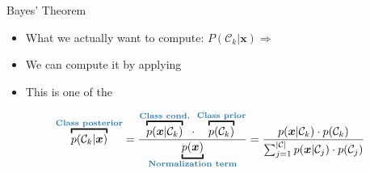\begin{frame}{Bayes' Theorem}{}\important
	\begin{itemize}
		\item What we actually want to compute: $P(\mathcal{C}_k \vert \bm{x}) \Rightarrow$
		\item We can compute it by applying 
		\item This is one of the 
	\end{itemize}

	\begin{boxBlue}
		\begin{equation}
			\overbracket{p(\mathcal{C}_k \vert \bm{x})}^{\text{\highlight{Class posterior}}}
				= \frac{
					\overbracket{p(\bm{x} \vert \mathcal{C}_k)}^{\text{\highlight{Class cond.}}}
					\cdot
					\overbracket{p(\mathcal{C}_k)}^{\text{\highlight{Class prior}}}
				}{
					\underbracket{p(\bm{x})}_{\text{\highlight{Normalization term}}}
				}
				= \frac{
					p(\bm{x} \vert \mathcal{C}_k) \cdot p(\mathcal{C}_k)
				}{
					\sum_{j=1}^{\vert \mathcal{C} \vert} p(\bm{x} \vert \mathcal{C}_j) \cdot p(\mathcal{C}_j)
				}
		\end{equation}
	\end{boxBlue}
\end{frame}


